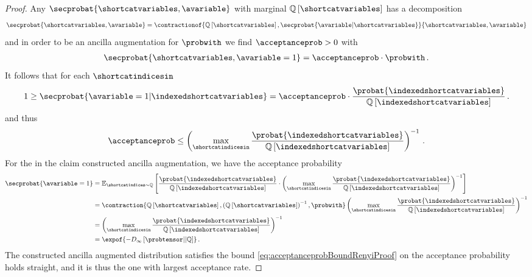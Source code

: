 \begin{proof}
    Any $\secprobat{\shortcatvariables,\avariable}$ with marginal $\mathbb{Q}\left[\shortcatvariables\right]$ has a decomposition
    \begin{align*}
        \secprobat{\shortcatvariables,\avariable}
        = \contractionof{\mathbb{Q}\left[\shortcatvariables\right],
            \secprobat{\avariable|\shortcatvariables}
        }{\shortcatvariables,\avariable}
    \end{align*}
    and in order to be an ancilla augmentation for $\probwith$ we find $\acceptanceprob>0$ with
    \begin{align*}
        \secprobat{\shortcatvariables,\avariable=1}
        = \acceptanceprob \cdot \probwith \, .
    \end{align*}
    It follows that for each $\shortcatindicesin$
    \begin{align*}
        1 \geq \secprobat{\avariable=1|\indexedshortcatvariables}
        = \acceptanceprob \cdot  \frac{\probat{\indexedshortcatvariables}}{\mathbb{Q}\left[\indexedshortcatvariables\right]} \, .
    \end{align*}
    and thus
    \begin{align}
        \label{eq:acceptanceprobBoundRenyiProof}
        \acceptanceprob \leq \left(\max_{\shortcatindicesin}\frac{\probat{\indexedshortcatvariables}}{\mathbb{Q}\left[\indexedshortcatvariables\right]}\right)^{-1} \, .
    \end{align}
    For the in the claim constructed ancilla augmentation, we have the acceptance probability
    \begin{align*}
        \secprobat{\avariable=1}
        &= \mathbb{E}_{\shortcatindices\sim\mathbb{Q}}
        \left[
            \frac{\probat{\indexedshortcatvariables}}{\mathbb{Q}\left[\indexedshortcatvariables\right]} \cdot
            \left(\max_{\shortcatindicesin} \frac{\probat{\indexedshortcatvariables}}{\mathbb{Q}\left[\indexedshortcatvariables\right]}
            \right)^{-1}
        \right] \\
        &= \contraction{\mathbb{Q}\left[\shortcatvariables\right],\left(\mathbb{Q}\left[\shortcatvariables\right]\right)^{-1},\probwith}
        \left(\max_{\shortcatindicesin}
            \frac{\probat{\indexedshortcatvariables}}{\mathbb{Q}\left[\indexedshortcatvariables\right]}
        \right)^{-1} \\
        & = \left(\max_{\shortcatindicesin}
                \frac{\probat{\indexedshortcatvariables}}{\mathbb{Q}\left[\indexedshortcatvariables\right]}
        \right)^{-1}  \\
        & = \expof{-D_{\infty}\left[\probtensor||\mathbb{Q}\right]} \, .
    \end{align*}
    The constructed ancilla augmented distribution satisfies the bound \eqref{eq:acceptanceprobBoundRenyiProof} on the acceptance probability holds straight, and it is thus the one with largest acceptance rate.
\end{proof}


